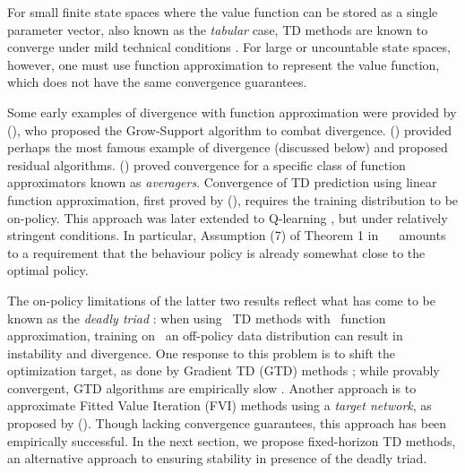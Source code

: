 \documentclass[letterpaper]{article} %
\newcommand{\citei}[1]{\citeauthor{#1} (\citeyear{#1})}
\begin{document}

For small finite state spaces where the value function can be stored as a single parameter vector, also known as the \textit{tabular} case, TD methods %
are known to converge under mild technical conditions %
\cite{rlbook2018}. For large or uncountable state spaces, however, one must use function approximation %
to represent the value function, which does not have the same convergence guarantees.

Some early examples of divergence with function approximation were provided by \citei{boyan1995generalization}, who proposed the Grow-Support algorithm to combat divergence. \citei{baird1995} provided perhaps the most famous example of divergence (discussed below) and proposed residual algorithms. \citei{gordon1995stable} proved convergence for a specific class of function approximators known as \textit{averagers}. Convergence of TD prediction using linear function approximation, first proved by \citei{tsitsiklis1997analysis}, requires the training distribution to be on-policy. This approach was later extended to Q-learning \cite{melo2007q}, but under relatively stringent conditions. In particular, Assumption (7) of Theorem 1 in ~\citeauthor{melo2007q}~ amounts to a requirement that the behaviour policy is already somewhat close to the optimal policy.

\newcommand{\triad}[1]{\,\raisebox{-0.26\baselineskip}{$^{(#1)}$}}
The on-policy limitations of the latter two results reflect what has come to be known as the \textit{deadly triad} \cite{rlbook2018}: when using \triad{1} TD methods with \triad{2} function approximation, training on \triad{3} an off-policy data distribution can result in instability and divergence. One response to this problem is to shift the optimization target, as done by Gradient TD (GTD) methods \cite{sutton2009fast,bhatnagar2009convergent}; while provably convergent, GTD algorithms are empirically slow \cite{ghiassian2018online,rlbook2018}. Another approach is to approximate Fitted Value Iteration (FVI) methods \cite{munos2008finite} using a \textit{target network}, as proposed by \citei{dqn2015}. Though lacking convergence guarantees, this approach has been empirically successful. In the next section, we propose fixed-horizon TD methods, an alternative approach to ensuring stability in presence of the deadly triad.
\end{document}
